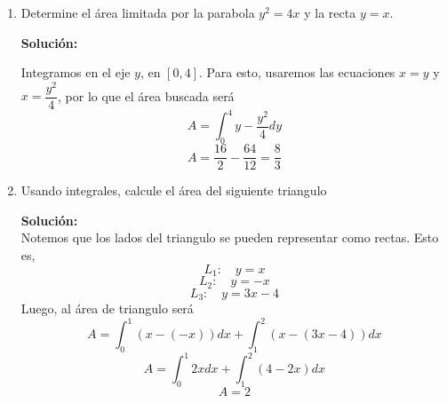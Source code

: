 \documentclass[12pt]{article}
\newenvironment{solucion}
{\begin{mdframed}[backgroundcolor=black!10]
		{\bf Solución:}\\
	}
	{
	\end{mdframed}
}
\newenvironment{preguntas}
{\begin{enumerate}\itemsep12pt
	}
	{
	\end{enumerate}
}
\newcommand{\ra}{\rightarrow}
\begin{document}
\begin{preguntas}
\begin{solucion}
Notemos que podemos escribir $F(x)$ de la siguiente forma
$$F(x) =
\displaystyle\int_{1-x}^{1} \ln(t^2)dt + \displaystyle\int_{1}^{1+x} \ln(t^2)dt =
-\displaystyle\int_{1}^{1-x} \ln(t^2)dt + \displaystyle\int_{1}^{1+x} \ln(t^2)dt
$$
Luego, al derivar,
$$F'(x) = -\ln((1-x)^2)\cdot (-1) + \ln((1+x)^2)$$
Simplificando,
$$F'(x) = \ln((1-x)^2) + \ln((1+x)^2)
= \ln(((1-x)(1+x))^2)
= 2\ln(1-x^2)$$
Luego, como 
$$0 \leq x \leq \dfrac{1}{2} \ra \dfrac{3}{4} \leq 1-x^2 \leq 1$$
Concluimos que 
$$F'(x) = 2\ln(1-x^2) \leq 0$$
Por lo que la función es decreciente.
\end{solucion}
\item Determine el área limitada por la parabola $y^2=4x$ y la recta $y=x$.
\begin{solucion}
\begin{center}
		\end{center}
		Integramos en el eje $y$, en $[0,4]$. Para esto, usaremos las ecuaciones $x=y$ y $x=\dfrac{y^2}{4}$, por lo que el área buscada será
		$$A = \displaystyle\int_0^4 y-\dfrac{y^2}{4} dy$$
		$$A = \dfrac{16}{2} - \dfrac{64}{12} = \dfrac{8}{3}$$
\end{solucion}
\item Usando integrales, calcule el área del siguiente triangulo
	\begin{center}
	\end{center}
\begin{solucion}
Notemos que los lados del triangulo se pueden representar como rectas. Esto es,
		$$L_1:\quad y = x$$
		$$L_2:\quad y = -x$$
		$$L_3:\quad y = 3x-4$$
		Luego, al área de triangulo será
		$$A = \displaystyle\int_0^1 (x - (-x))dx + \displaystyle\int_1^2 (x - (3x-4))dx$$
		$$A = \displaystyle\int_0^1 2xdx + \displaystyle\int_1^2 (4-2x)dx$$
		$$A = 2$$
\end{solucion}
\end{preguntas}
\end{document}
